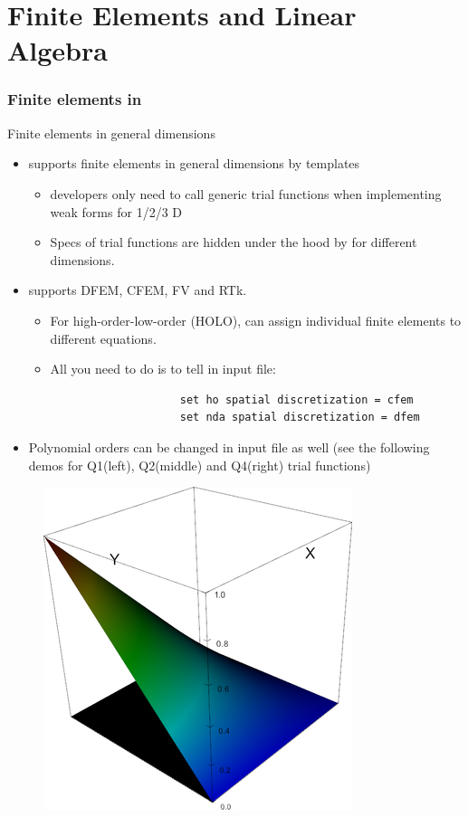 \section{Finite Elements and Linear Algebra}
\begin{frame}[fragile]
	\frametitle{Finite elements in }
	\begin{block}{Finite elements in general dimensions}
		\begin{itemize}
			\item {} supports finite elements in general dimensions by templates
			\begin{itemize}
				\item {} developers only need to call generic trial functions when implementing weak forms for 1/2/3 D
				\item Specs of trial functions are hidden under the hood by  for different dimensions.
			\end{itemize}
			\item {} supports DFEM, CFEM, FV and RTk.
			\begin{itemize}
				\item For high-order-low-order (HOLO),  can assign individual finite elements to different equations.
				\item All you need to do is to tell  in input file:
				{
					\color{red}
					\begin{verbatim}
					set ho spatial discretization = cfem
					set nda spatial discretization = dfem
					\end{verbatim}
				}
			\end{itemize}
			\item Polynomial orders can be changed in input file as well (see the following demos for Q1(left), Q2(middle) and Q4(right) trial functions)
		\end{itemize}
	\end{block}
	\begin{figure}
		\includegraphics*[scale=0.25]{graphic/fe/q1_fe}

\end{figure}
\end{frame}
